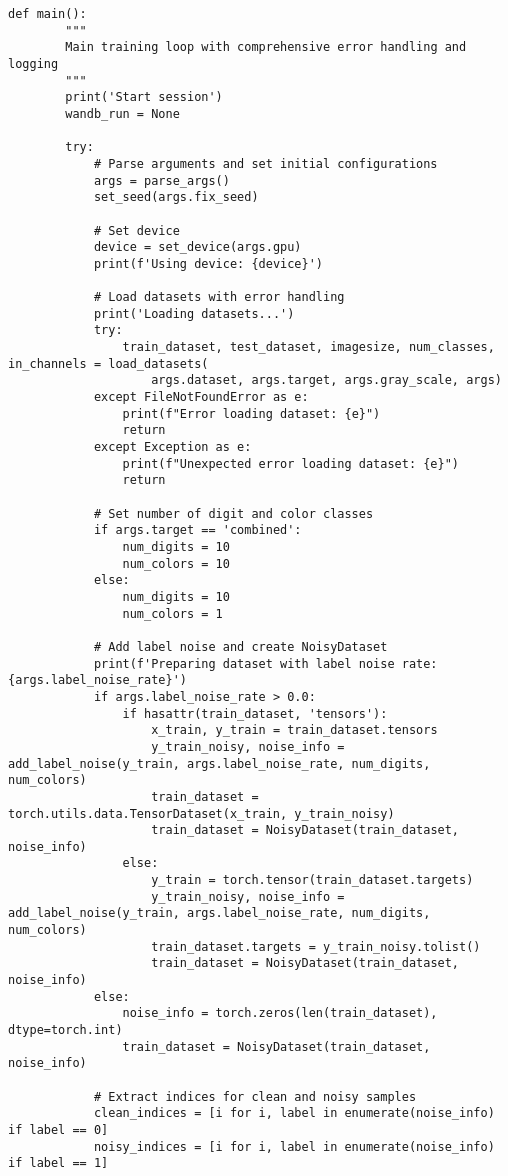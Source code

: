 \begin{lstlisting}[style=pythonstyle, caption={Program Example}]
    def main():
        """
        Main training loop with comprehensive error handling and logging
        """
        print('Start session')
        wandb_run = None
        
        try:
            # Parse arguments and set initial configurations
            args = parse_args()
            set_seed(args.fix_seed)
            
            # Set device
            device = set_device(args.gpu)
            print(f'Using device: {device}')
    
            # Load datasets with error handling
            print('Loading datasets...')
            try:
                train_dataset, test_dataset, imagesize, num_classes, in_channels = load_datasets(
                    args.dataset, args.target, args.gray_scale, args)
            except FileNotFoundError as e:
                print(f"Error loading dataset: {e}")
                return
            except Exception as e:
                print(f"Unexpected error loading dataset: {e}")
                return
    
            # Set number of digit and color classes
            if args.target == 'combined':
                num_digits = 10
                num_colors = 10
            else:
                num_digits = 10
                num_colors = 1
    
            # Add label noise and create NoisyDataset
            print(f'Preparing dataset with label noise rate: {args.label_noise_rate}')
            if args.label_noise_rate > 0.0:
                if hasattr(train_dataset, 'tensors'):
                    x_train, y_train = train_dataset.tensors
                    y_train_noisy, noise_info = add_label_noise(y_train, args.label_noise_rate, num_digits, num_colors)
                    train_dataset = torch.utils.data.TensorDataset(x_train, y_train_noisy)
                    train_dataset = NoisyDataset(train_dataset, noise_info)
                else:
                    y_train = torch.tensor(train_dataset.targets)
                    y_train_noisy, noise_info = add_label_noise(y_train, args.label_noise_rate, num_digits, num_colors)
                    train_dataset.targets = y_train_noisy.tolist()
                    train_dataset = NoisyDataset(train_dataset, noise_info)
            else:
                noise_info = torch.zeros(len(train_dataset), dtype=torch.int)
                train_dataset = NoisyDataset(train_dataset, noise_info)
    
            # Extract indices for clean and noisy samples
            clean_indices = [i for i, label in enumerate(noise_info) if label == 0]
            noisy_indices = [i for i, label in enumerate(noise_info) if label == 1]
    

\end{lstlisting}
